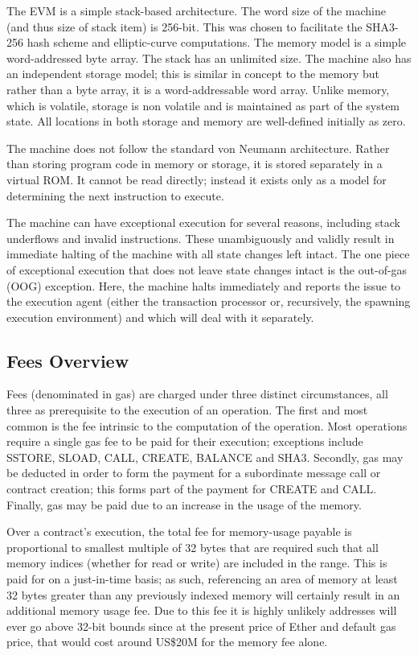 \documentclass[9pt,oneside]{amsart}
\begin{document}
\begin{multicols}{2}
The EVM is a simple stack-based architecture. The word size of the machine (and thus size of stack item) is 256-bit. This was chosen to facilitate the SHA3-256 hash scheme and elliptic-curve computations. The memory model is a simple word-addressed byte array. The stack has an unlimited size. The machine also has an independent storage model; this is similar in concept to the memory but rather than a byte array, it is a word-addressable word array. Unlike memory, which is volatile, storage is non volatile and is maintained as part of the system state. All locations in both storage and memory are well-defined initially as zero.

The machine does not follow the standard von Neumann architecture. Rather than storing program code in memory or storage, it is stored separately in a virtual ROM. It cannot be read directly; instead it exists only as a model for determining the next instruction to execute.

The machine can have exceptional execution for several reasons, including stack underflows and invalid instructions. These unambiguously and validly result in immediate halting of the machine with all state changes left intact. The one piece of exceptional execution that does not leave state changes intact is the out-of-gas (OOG) exception. Here, the machine halts immediately and reports the issue to the execution agent (either the transaction processor or, recursively, the spawning execution environment) and which will deal with it separately.

\subsection{Fees Overview}

Fees (denominated in gas) are charged under three distinct circumstances, all three as prerequisite to the execution of an operation. The first and most common is the fee intrinsic to the computation of the operation. Most operations require a single gas fee to be paid for their execution; exceptions include {\small SSTORE}, {\small SLOAD}, {\small CALL}, {\small CREATE}, {\small BALANCE} and {\small SHA3}. Secondly, gas may be deducted in order to form the payment for a subordinate message call or contract creation; this forms part of the payment for {\small CREATE} and {\small CALL}. Finally, gas may be paid due to an increase in the usage of the memory.

Over a contract's execution, the total fee for memory-usage payable is proportional to smallest multiple of 32 bytes that are required such that all memory indices (whether for read or write) are included in the range. This is paid for on a just-in-time basis; as such, referencing an area of memory at least 32 bytes greater than any previously indexed memory will certainly result in an additional memory usage fee. Due to this fee it is highly unlikely addresses will ever go above 32-bit bounds since at the present price of Ether and default gas price, that would cost around US\$20M for the memory fee alone.


\end{multicols}
\end{document}
